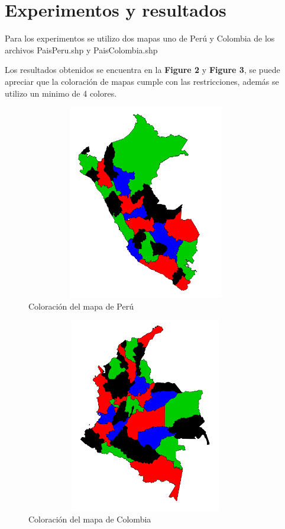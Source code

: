 \documentclass[a4paper]{article}
\begin{document}
\pagebreak
\section{Experimentos y resultados}

Para los experimentos se utilizo dos mapas uno de Perú y Colombia de los archivos PaisPeru.shp y PaisColombia.shp

Los resultados obtenidos se encuentra en la \textbf{Figure 2} y \textbf{Figure 3}, se puede apreciar que la coloración de mapas cumple con las restricciones, además se utilizo un minimo de 4 colores.



\begin{figure}
	\centering
	\includegraphics[width=10.5cm,height=8.5cm]{Peru.png}
	\caption{Coloración del mapa de Perú}
	\label{FI1_1}
\end{figure}

\begin{figure}
	\centering
	\includegraphics[width=10.5cm,height=8.5cm]{Colombia.png}
	\caption{Coloración del mapa de Colombia}
	\label{FI2_1}
\end{figure}
\end{document}
